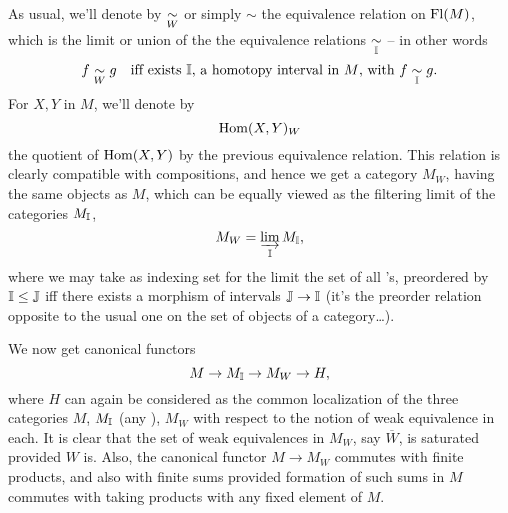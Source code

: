As usual, we'll denote by $\mathrel{\underset{W}{\sim}}$ or simply $\sim$ the equivalence
relation on $\operatorname{Fl}(M)$, which is the limit or union of the the
equivalence relations $\mathrel{\underset{{\mathbb{I}}}{\sim}}$ -- in other words
\[f\mathrel{\underset{W}{\sim}} g\quad\text{if{f} exists {\ensuremath{\mathbb{I}}}, a homotopy interval in $M$,
  with $f\mathrel{\underset{{\mathbb{I}}}{\sim}} g$.}\]
For $X,Y$ in $M$, we'll denote by
\[ \operatorname{Hom}(X,Y)_W\]
the quotient of $\operatorname{Hom}(X,Y)$ by the previous equivalence relation. This
relation is clearly compatible with compositions, and hence we get a
category $M_W$, having the same objects as $M$, which can be equally
viewed as the filtering limit of the categories $M_{\mathbb{I}}$,
\[ M_W = \varinjlim_{\mathbb{I}} M_{\mathbb{I}},\]
where we may take as indexing set for the limit the set of all \bI's,
preordered by ${\mathbb{I}}\le{\ensuremath{\mathbb{J}}}$ if{f} there exists a morphism of intervals
${\mathbb{J}}\to{\ensuremath{\mathbb{I}}}$ (it's the preorder relation opposite to the usual one on
the set of objects of a category\ldots).

We now get canonical functors
\[ M \to M_{\mathbb{I}} \to M_W \to H,\]
where $H$ can again be considered as the common localization of the
three categories $M$, $M_{\mathbb{I}}$ (any \bI), $M_W$ with respect to the
notion of weak equivalence in each. It is clear that the set of weak
equivalences in $M_W$, say $\overline W$, is saturated provided $W$
is. Also, the canonical functor $M\to M_W$ commutes with finite
products, and also with finite sums provided formation of such sums in
$M$ commutes with taking products with any fixed element of $M$.

